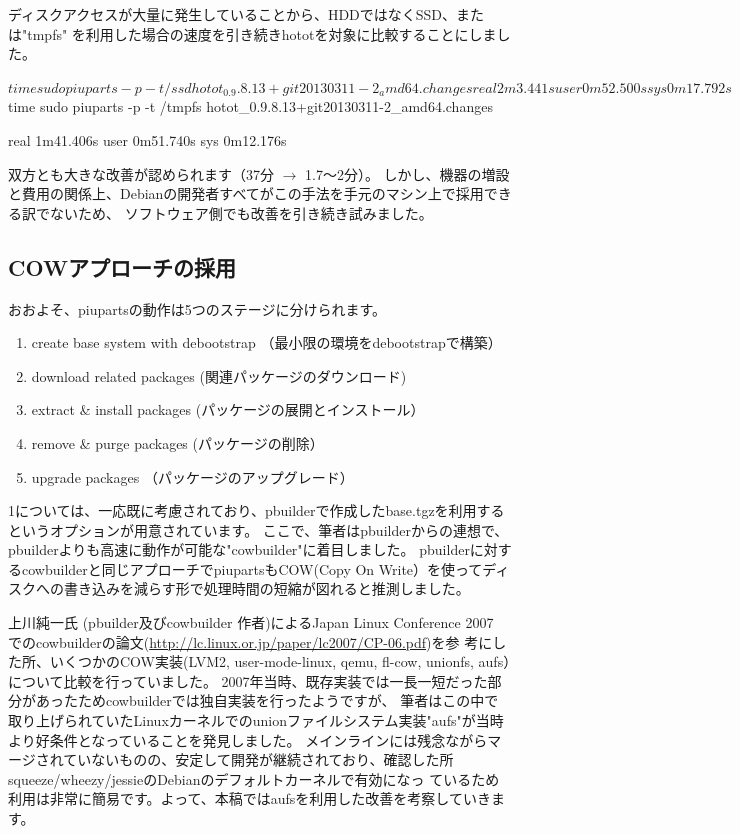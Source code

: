 \documentclass[mingoth,a4paper,twoside]{jsarticle}
\begin{document}
ディスクアクセスが大量に発生していることから、HDDではなくSSD、または"tmpfs"
を利用した場合の速度を引き続きhototを対象に比較することにしました。

\begin{commandline}
$ time sudo piuparts -p -t /ssd hotot_0.9.8.13+git20130311-2_amd64.changes

real 2m3.441s
user 0m52.500s
sys  0m17.792s

$ time sudo piuparts -p -t /tmpfs hotot_0.9.8.13+git20130311-2_amd64.changes

real 1m41.406s
user 0m51.740s
sys  0m12.176s
\end{commandline}

双方とも大きな改善が認められます（37分 $\rightarrow$ 1.7〜2分）。
しかし、機器の増設と費用の関係上、Debianの開発者すべてがこの手法を手元のマシン上で採用できる訳でないため、
ソフトウェア側でも改善を引き続き試みました。

\subsection{COWアプローチの採用}

おおよそ、piupartsの動作は5つのステージに分けられます。

\begin{enumerate}
\item create base system with debootstrap （最小限の環境をdebootstrapで構築）
\item download related packages (関連パッケージのダウンロード)
\item extract \& install packages (パッケージの展開とインストール）
\item remove \& purge packages (パッケージの削除）
\item upgrade packages （パッケージのアップグレード）
\end{enumerate}

1については、一応既に考慮されており、pbuilderで作成したbase.tgzを利用するというオプションが用意されています。
ここで、筆者はpbuilderからの連想で、pbuilderよりも高速に動作が可能な"cowbuilder"に着目しました。
pbuilderに対するcowbuilderと同じアプローチでpiupartsもCOW(Copy On Write）を使ってディスクへの書き込みを減らす形で処理時間の短縮が図れると推測しました。

上川純一氏 (pbuilder及びcowbuilder 作者)によるJapan Linux Conference 2007 でのcowbuilderの論文(\url{http://lc.linux.or.jp/paper/lc2007/CP-06.pdf})を参
考にした所、いくつかのCOW実装(LVM2, user-mode-linux, qemu, fl-cow, unionfs, aufs）について比較を行っていました。
2007年当時、既存実装では一長一短だった部分があったためcowbuilderでは独自実装を行ったようですが、
筆者はこの中で取り上げられていたLinuxカーネルでのunionファイルシステム実装"aufs"が当時より好条件となっていることを発見しました。
メインラインには残念ながらマージされていないものの、安定して開発が継続されており、確認した所squeeze/wheezy/jessieのDebianのデフォルトカーネルで有効になっ
ているため利用は非常に簡易です。よって、本稿ではaufsを利用した改善を考察していきます。
\end{document}
